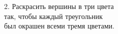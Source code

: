 \documentclass[preview]{standalone}
\begin{document}
\begin{center}
2. Раскрасить вершины в три цвета\\так, чтобы каждый треугольник\\был окрашен всеми тремя цветами.
\end{center}
\end{document}
